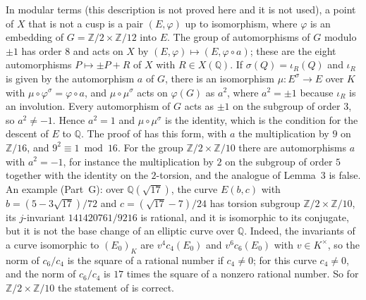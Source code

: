 \documentclass[11pt]{article}
\newcommand{\Q}{\mathbb Q}
\newcommand{\Z}{\mathbb Z}
\begin{document}
\begin{enumerate}
In modular terms (this description is not proved here and it is not used), a point of \(X\) that is not a cusp
is a pair \((E,\varphi)\) up to isomorphism, where \(\varphi\) is an embedding of \(G=\Z/2\times\Z/12\) into
\(E\). The group of automorphisms of \(G\) modulo \(\pm1\) has order \(8\) and acts on \(X\) by
\((E,\varphi)\mapsto(E,\varphi\circ a)\); these are the eight automorphisms \(P\mapsto\pm P+R\) of \(X\) with
\(R\in X(\Q)\). If \(\sigma(Q)=\iota_R(Q)\) and \(\iota_R\) is given by the automorphism \(a\) of \(G\), there is
an isomorphism \(\mu\colon E^\sigma\to E\) over \(K\) with \(\mu\circ\varphi^\sigma=\varphi\circ a\), and
\(\mu\circ\mu^\sigma\) acts on \(\varphi(G)\) as \(a^2\), where \(a^2=\pm1\) because \(\iota_R\) is an involution.
Every automorphism of \(G\) acts as \(\pm1\) on the subgroup of order \(3\), so \(a^2\neq-1\). Hence \(a^2=1\) and
\(\mu\circ\mu^\sigma\) is the identity, which is the condition for the descent of \(E\) to \(\Q\). The proof of
\cite[Theorem~1.1]{BN} has this form, with \(a\) the multiplication by \(9\) on \(\Z/16\), and
\(9^2\equiv1\bmod16\). For the group \(\Z/2\times\Z/10\) there are automorphisms \(a\) with \(a^2=-1\), for
instance the multiplication by \(2\) on the subgroup of order \(5\) together with the identity on the
\(2\)-torsion, and the analogue of Lemma~3 is false. An example (Part~G): over \(\Q(\sqrt{17})\), the curve
\(E(b,c)\) with \(b=(5-3\sqrt{17})/72\) and \(c=(\sqrt{17}-7)/24\) has torsion subgroup \(\Z/2\times\Z/10\), its
\(j\)-invariant \(141420761/9216\) is rational, and it is isomorphic to its conjugate, but it is not the base
change of an elliptic curve over \(\Q\). Indeed, the invariants of a curve isomorphic to \((E_0)_K\) are
\(v^4c_4(E_0)\) and \(v^6c_6(E_0)\) with \(v\in K^\times\), so the norm of \(c_6/c_4\) is the square of a
rational number if \(c_4\neq0\); for this curve \(c_4\neq0\), and the norm of \(c_6/c_4\) is \(17\) times the
square of a nonzero rational number. So for \(\Z/2\times\Z/10\) the statement of \cite{BN} is correct.


\end{enumerate}
\end{document}
